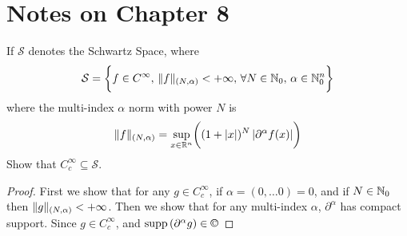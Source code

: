 \documentclass[../../main.tex]{subfiles}
\begin{document}
\providecommand{\szz}{\mathcal{S}}
\providecommand{\ccinf}{C_c^\infty}
\section*{Notes on Chapter 8}
\begin{wts}
    If $\szz$ denotes the Schwartz Space, where
    \[
    \szz = \biggl\{f\in C^\infty,\, \norm{f}_{(N,\alpha)}<+\infty,\,\forall N\in\nat_0,\,\alpha\in\nat_0^n\biggr\}
    \]
    where the multi-index $\alpha$ norm with power $N$ is 
    \[
    \lVert {f} \rVert_{(N,\alpha)}=\sup_{x\in\mathbb{R}^n}\biggl((1+|x|)^N\left|\partial^\alpha f(x)\right|\biggr)
    \]
    Show that $\ccinf\subseteq \szz$.
\end{wts}
\begin{proof}
    First we show that for any $g\in \ccinf$, if $\alpha = (0,\ldots 0)=0$, and if $N\in\mathbb{N}_0$ then $\lVert {g} \rVert_{(N,\alpha)}<+\infty$. Then we show that for any multi-index $\alpha$, $\partial^\alpha$ has compact support. Since $g\in\ccinf$, and $\supp{\partial^\alpha g}\in \cpt$
\end{proof}
\end{document}
